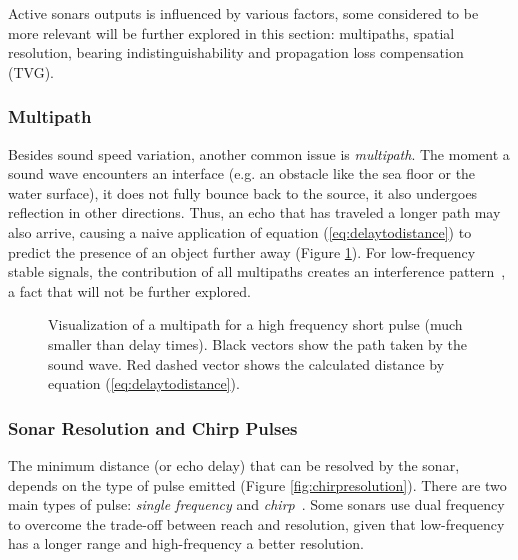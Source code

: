Active sonars outputs is influenced by various factors, some considered to be
more relevant will be further explored in this section: multipaths, spatial
resolution, bearing indistinguishability and propagation loss compensation
(TVG).



\subsubsection{Multipath}


Besides sound speed variation, another common issue is \textit{multipath}. The
moment a sound wave encounters an interface (e.g. an obstacle like the sea floor
or the water surface), it does not fully bounce back to the source, it also undergoes
reflection in other directions. Thus, an echo that has traveled a longer
path may also arrive, causing a naive application of equation
(\ref{eq:delaytodistance}) to predict the presence of an object further away
(Figure \ref{fig:multipath}). For low-frequency stable signals, the contribution
of all multipaths creates an interference pattern~\cite{LURTON}, a fact that will not be further explored. 

\begin{figure}
	\centering
	
	\caption{Visualization of a multipath for a high frequency short pulse (much
	smaller than delay times). Black vectors show the path taken by the sound
	wave. Red dashed vector shows the calculated distance by equation
	(\ref{eq:delaytodistance}).}
	\label{fig:multipath}
\end{figure}

\subsubsection{Sonar Resolution and Chirp Pulses}

The minimum distance (or echo delay) that can be resolved by the sonar, depends
on the type of pulse emitted (Figure \ref{fig:chirpresolution}). There are two
main types of pulse:
\textit{single frequency} and \textit{chirp}~\cite{chirp,gaussianchirp}. Some
sonars use dual frequency to overcome the trade-off between reach and
resolution, given that low-frequency has a longer range and high-frequency a better resolution.

